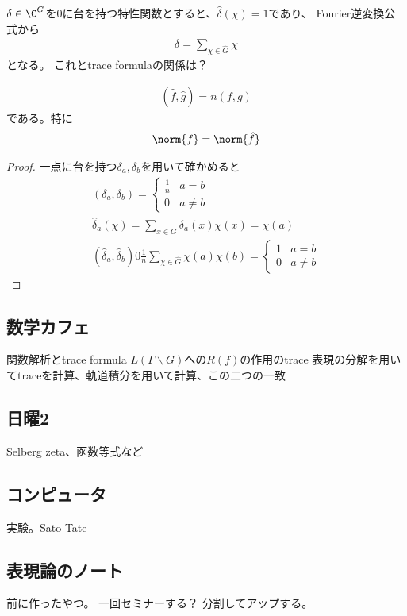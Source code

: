 \documentclass{jsarticle}
\begin{document}
$\delta\in\C^G$を$0$に台を持つ特性関数とすると、$\hat{\delta}(\chi)=1$であり、
Fourier逆変換公式から
\begin{align*}
\delta=\sum_{\chi\in\hat{G}}\chi
\end{align*}
となる。
これとtrace formulaの関係は？

\begin{thm}[Plancherel公式]
\begin{align*}
(\hat{f},\hat{g})=n(f,g)
\end{align*}
である。特に
\begin{align*}
\norm{f}=\norm{\hat{f}}
\end{align*}
\end{thm}
\begin{proof}
一点に台を持つ$\delta_a, \delta_b$を用いて確かめると
\begin{align*}
(\delta_a,\delta_b)=\begin{cases}\frac{1}{n}&a=b\\0&a\neq b\end{cases}\\
\hat{\delta}_a(\chi)=\sum_{x\in G}\delta_a(x)\chi(x)=\chi(a)\\
(\hat{\delta}_a,\hat{\delta}_b)0\frac{1}{n}\sum_{\chi\in\hat{G}}\chi(a)\chi(b)=\begin{cases}1&a=b\\0&a\neq b\end{cases}
\end{align*}


\end{proof}

\subsection{数学カフェ}
関数解析とtrace formula
$L(\Gamma\backslash G)$への$R(f)$の作用のtrace
表現の分解を用いてtraceを計算、軌道積分を用いて計算、この二つの一致
\subsection{日曜2}
Selberg zeta、函数等式など
\subsection{コンピュータ}
実験。Sato-Tate
\subsection{表現論のノート}
前に作ったやつ。
一回セミナーする？
分割してアップする。
\end{document}
